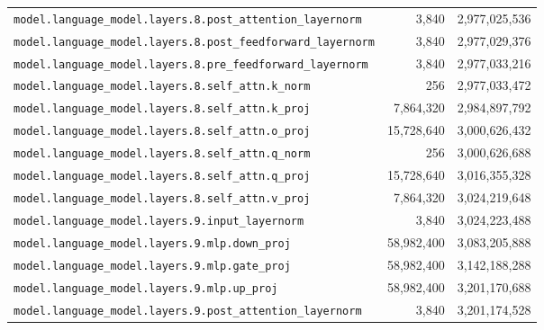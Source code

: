 \documentclass[10pt,a4paper]{article}
\theoremstyle{definition}
\begin{document}
\begin{appendices}
\begin{longtable}{p{9.5cm}rr}
\texttt{model.\allowbreak{}language\_model.\allowbreak{}layers.\allowbreak{}8.\allowbreak{}post\_attention\_layernorm} & 3,840 & 2,977,025,536 \\
\texttt{model.\allowbreak{}language\_model.\allowbreak{}layers.\allowbreak{}8.\allowbreak{}post\_feedforward\_layernorm} & 3,840 & 2,977,029,376 \\
\texttt{model.\allowbreak{}language\_model.\allowbreak{}layers.\allowbreak{}8.\allowbreak{}pre\_feedforward\_layernorm} & 3,840 & 2,977,033,216 \\
\texttt{model.\allowbreak{}language\_model.\allowbreak{}layers.\allowbreak{}8.\allowbreak{}self\_attn.\allowbreak{}k\_norm} & 256 & 2,977,033,472 \\
\texttt{model.\allowbreak{}language\_model.\allowbreak{}layers.\allowbreak{}8.\allowbreak{}self\_attn.\allowbreak{}k\_proj} & 7,864,320 & 2,984,897,792 \\
\texttt{model.\allowbreak{}language\_model.\allowbreak{}layers.\allowbreak{}8.\allowbreak{}self\_attn.\allowbreak{}o\_proj} & 15,728,640 & 3,000,626,432 \\
\texttt{model.\allowbreak{}language\_model.\allowbreak{}layers.\allowbreak{}8.\allowbreak{}self\_attn.\allowbreak{}q\_norm} & 256 & 3,000,626,688 \\
\texttt{model.\allowbreak{}language\_model.\allowbreak{}layers.\allowbreak{}8.\allowbreak{}self\_attn.\allowbreak{}q\_proj} & 15,728,640 & 3,016,355,328 \\
\texttt{model.\allowbreak{}language\_model.\allowbreak{}layers.\allowbreak{}8.\allowbreak{}self\_attn.\allowbreak{}v\_proj} & 7,864,320 & 3,024,219,648 \\
\texttt{model.\allowbreak{}language\_model.\allowbreak{}layers.\allowbreak{}9.\allowbreak{}input\_layernorm} & 3,840 & 3,024,223,488 \\
\texttt{model.\allowbreak{}language\_model.\allowbreak{}layers.\allowbreak{}9.\allowbreak{}mlp.\allowbreak{}down\_proj} & 58,982,400 & 3,083,205,888 \\
\texttt{model.\allowbreak{}language\_model.\allowbreak{}layers.\allowbreak{}9.\allowbreak{}mlp.\allowbreak{}gate\_proj} & 58,982,400 & 3,142,188,288 \\
\texttt{model.\allowbreak{}language\_model.\allowbreak{}layers.\allowbreak{}9.\allowbreak{}mlp.\allowbreak{}up\_proj} & 58,982,400 & 3,201,170,688 \\
\texttt{model.\allowbreak{}language\_model.\allowbreak{}layers.\allowbreak{}9.\allowbreak{}post\_attention\_layernorm} & 3,840 & 3,201,174,528 \\

\end{longtable}
\end{appendices}
\end{document}
